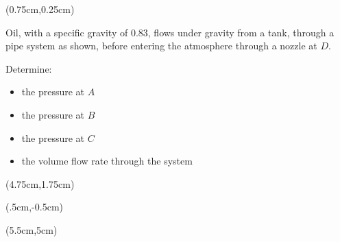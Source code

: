 \documentclass[9pt,xcolor={svgnames, x11names},professionalfonts, mathserif]{beamer}
\begin{document}


\begin{frame}
	\begin{textblock*}{4.75cm} (0.75cm,0.25cm)
		\begin{myexam}[colframe=example, colbacktitle=example!80!white]{}{}
			\raggedright
			Oil, with a specific gravity of $0.83$, flows under gravity from a tank, through a pipe system as shown, before
			entering the atmosphere through a nozzle at $D$. \par
			Determine:
			\begin{itemize}
				\item the pressure at $A$
				\item the pressure at $B$
				\item the pressure at $C$
				\item the volume flow rate through the system
			\end{itemize}
		\end{myexam}
	\end{textblock*}
	
	\begin{textblock*}{6cm}(4.75cm,1.75cm)
	\end{textblock*}
\end{frame}





\begin{frame}
	\begin{textblock*}{6cm} (.5cm,-0.5cm)
	\end{textblock*}
	\begin{textblock*}{6cm }(5.5cm,5cm)
		
		
	\end{textblock*}
\end{frame}
\end{document}
